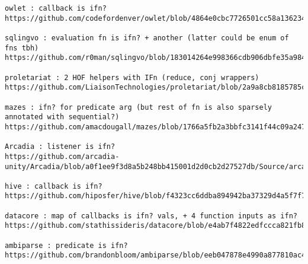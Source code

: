 \begin{verbatim}
owlet : callback is ifn?
https://github.com/codefordenver/owlet/blob/4864e0cbc7726501cc58a1362347f07f10524ed7/src/cljs/owlet/views/confirm.cljs#L12

sqlingvo : evaluation fn is ifn? + another (latter could be enum of fns tbh)
https://github.com/r0man/sqlingvo/blob/183014264e998366cdb906dbfe35a984c7d5443f/src/sqlingvo/db.cljc

proletariat : 2 HOF helpers with IFn (reduce, conj wrappers)
https://github.com/LiaisonTechnologies/proletariat/blob/2a9a8cb8185785cb1d12376da21ddb97d5e43d51/src/proletariat/core.clj#L566

mazes : ifn? for predicate arg (but rest of fn is also sparsely annotated with sequential?)
https://github.com/amacdougall/mazes/blob/1766a5fb2a3bbfc3141f44c09a2477a1ec65edef/src/cljc/mazes/generators/wilson.cljc#L36

Arcadia : listener is ifn?
https://github.com/arcadia-unity/Arcadia/blob/a0f1ee9f3d8a5b248bb415001d2d0cb2d27527db/Source/arcadia/internal/state.clj#L52

hive : callback is ifn?
https://github.com/hiposfer/hive/blob/f4323cc6ddba894942ba37329d4a5f7f7f974024/src/hive/services/raw/location.cljs#L12

datacore : map of callbacks is ifn? vals, + 4 function inputs as ifn?
https://github.com/stathissideris/datacore/blob/e4ab7f4822edfccca821fb8f4f9ec81a69e9d056/src/datacore/cells.clj#L59

ambiparse : predicate is ifn?
https://github.com/brandonbloom/ambiparse/blob/eeb047878e4990a877810ac4805a45d8cfe9acfb/src/ambiparse/gll.clj#L175
\end{verbatim}
\endgroup
